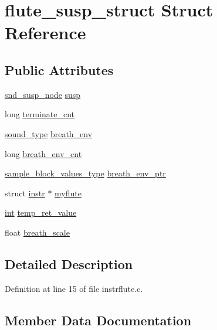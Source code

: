 \hypertarget{structflute__susp__struct}{}\section{flute\+\_\+susp\+\_\+struct Struct Reference}
\label{structflute__susp__struct}
\subsection*{Public Attributes}
\begin{DoxyCompactItemize}
\item 
\hyperlink{sound_8h_a6b268203688a934bd798ceb55f85d4c0}{snd\+\_\+susp\+\_\+node} \hyperlink{structflute__susp__struct_abe3b3b1bb29e8128090892e99fe45d72}{susp}
\item 
long \hyperlink{structflute__susp__struct_a6331f9bfa0d2a68927b5856808a527bc}{terminate\+\_\+cnt}
\item 
\hyperlink{sound_8h_a792cec4ed9d6d636d342d9365ba265ea}{sound\+\_\+type} \hyperlink{structflute__susp__struct_acefc0e8b254cc7f1d030f6b65a629d66}{breath\+\_\+env}
\item 
long \hyperlink{structflute__susp__struct_a1fed01857c97251f2c2a55ad93ae68c7}{breath\+\_\+env\+\_\+cnt}
\item 
\hyperlink{sound_8h_a83d17f7b465d1591f27cd28fc5eb8a03}{sample\+\_\+block\+\_\+values\+\_\+type} \hyperlink{structflute__susp__struct_a41a775f86ac5f44d93c06de861226ae1}{breath\+\_\+env\+\_\+ptr}
\item 
struct \hyperlink{structinstr}{instr} $\ast$ \hyperlink{structflute__susp__struct_aec4cd288f6f47faf065d16c01da2f9a4}{myflute}
\item 
\hyperlink{xmltok_8h_a5a0d4a5641ce434f1d23533f2b2e6653}{int} \hyperlink{structflute__susp__struct_abdc2f77c3717a23a5b57c883c62ee825}{temp\+\_\+ret\+\_\+value}
\item 
float \hyperlink{structflute__susp__struct_ac9523e1324decebb595b41123a6c354d}{breath\+\_\+scale}
\end{DoxyCompactItemize}


\subsection{Detailed Description}


Definition at line 15 of file instrflute.\+c.



\subsection{Member Data Documentation}
